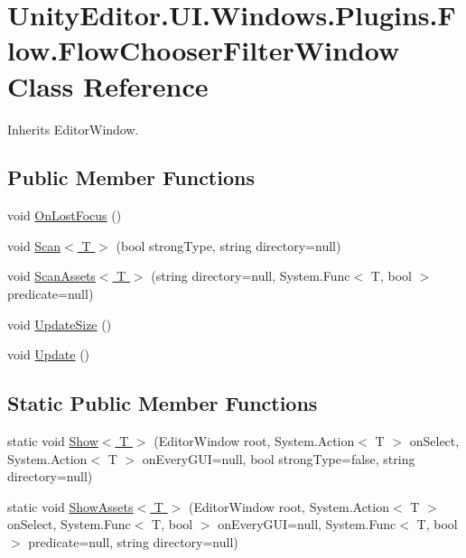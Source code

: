 \hypertarget{class_unity_editor_1_1_u_i_1_1_windows_1_1_plugins_1_1_flow_1_1_flow_chooser_filter_window}{}\section{Unity\+Editor.\+U\+I.\+Windows.\+Plugins.\+Flow.\+Flow\+Chooser\+Filter\+Window Class Reference}
\label{class_unity_editor_1_1_u_i_1_1_windows_1_1_plugins_1_1_flow_1_1_flow_chooser_filter_window}


Inherits Editor\+Window.

\subsection*{Public Member Functions}
\begin{DoxyCompactItemize}
\item 
void \hyperlink{class_unity_editor_1_1_u_i_1_1_windows_1_1_plugins_1_1_flow_1_1_flow_chooser_filter_window_ac66ea21e672859ffdc85233ebb00924d}{On\+Lost\+Focus} ()
\item 
void \hyperlink{class_unity_editor_1_1_u_i_1_1_windows_1_1_plugins_1_1_flow_1_1_flow_chooser_filter_window_a7205a1c942d516fe70e66188fa749f02}{Scan$<$ T $>$} (bool strong\+Type, string directory=null)
\item 
void \hyperlink{class_unity_editor_1_1_u_i_1_1_windows_1_1_plugins_1_1_flow_1_1_flow_chooser_filter_window_a39a8a40f10071d669b26be8627a02656}{Scan\+Assets$<$ T $>$} (string directory=null, System.\+Func$<$ T, bool $>$ predicate=null)
\item 
void \hyperlink{class_unity_editor_1_1_u_i_1_1_windows_1_1_plugins_1_1_flow_1_1_flow_chooser_filter_window_aaa284547a737aea28f9ff1c9198a5bee}{Update\+Size} ()
\item 
void \hyperlink{class_unity_editor_1_1_u_i_1_1_windows_1_1_plugins_1_1_flow_1_1_flow_chooser_filter_window_a51003bcb6ae352fbbfe83bc1ba295d3b}{Update} ()
\end{DoxyCompactItemize}
\subsection*{Static Public Member Functions}
\begin{DoxyCompactItemize}
\item 
static void \hyperlink{class_unity_editor_1_1_u_i_1_1_windows_1_1_plugins_1_1_flow_1_1_flow_chooser_filter_window_a76298eeba0707fdbf25c388e19623fe2}{Show$<$ T $>$} (Editor\+Window root, System.\+Action$<$ T $>$ on\+Select, System.\+Action$<$ T $>$ on\+Every\+G\+U\+I=null, bool strong\+Type=false, string directory=null)
\item 
static void \hyperlink{class_unity_editor_1_1_u_i_1_1_windows_1_1_plugins_1_1_flow_1_1_flow_chooser_filter_window_ac6a9dbf3e67cab5e30d66b4a3773ba9f}{Show\+Assets$<$ T $>$} (Editor\+Window root, System.\+Action$<$ T $>$ on\+Select, System.\+Func$<$ T, bool $>$ on\+Every\+G\+U\+I=null, System.\+Func$<$ T, bool $>$ predicate=null, string directory=null)
\end{DoxyCompactItemize}


